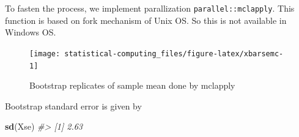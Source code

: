 \documentclass[]{book}
\newenvironment{Shaded}{\begin{snugshade}}{\end{snugshade}}
\newcommand{\CommentTok}[1]{\textcolor[rgb]{0.56,0.35,0.01}{\textit{#1}}}
\newcommand{\ControlFlowTok}[1]{\textcolor[rgb]{0.13,0.29,0.53}{\textbf{#1}}}
\newcommand{\DataTypeTok}[1]{\textcolor[rgb]{0.13,0.29,0.53}{#1}}
\newcommand{\DecValTok}[1]{\textcolor[rgb]{0.00,0.00,0.81}{#1}}
\newcommand{\KeywordTok}[1]{\textcolor[rgb]{0.13,0.29,0.53}{\textbf{#1}}}
\newcommand{\NormalTok}[1]{#1}
\newcommand{\OperatorTok}[1]{\textcolor[rgb]{0.81,0.36,0.00}{\textbf{#1}}}
\newcommand{\StringTok}[1]{\textcolor[rgb]{0.31,0.60,0.02}{#1}}
\theoremstyle{definition}
\theoremstyle{definition}
\theoremstyle{definition}
\theoremstyle{remark}
\begin{document}
To fasten the process, we implement parallization \texttt{parallel::mclapply}. This function is based on fork mechanism of Unix OS. So this is not available in Windows OS.

\begin{Shaded}
\end{Shaded}

\begin{Shaded}
\end{Shaded}

\begin{figure}[H]

{\centering \texttt{[image: statistical-computing\_files/figure-latex/xbarsemc-1]} 

}

\caption{Bootstrap replicates of sample mean done by mclapply}\label{fig:xbarsemc}
\end{figure}

Bootstrap standard error is given by

\begin{Shaded}
\begin{Highlighting}[]
\KeywordTok{sd}\NormalTok{(Xse)}
\CommentTok{#> [1] 2.63}
\end{Highlighting}
\end{Shaded}
\end{document}
